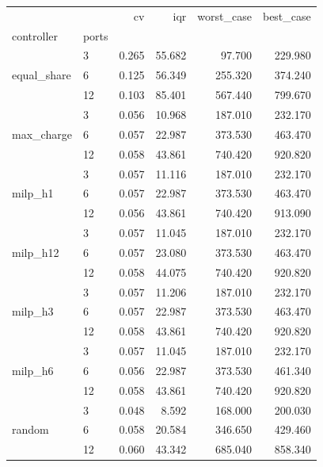 \begin{tabular}{llrrrr}
\toprule
 &  & cv & iqr & worst_case & best_case \\
controller & ports &  &  &  &  \\
\midrule
\multirow[t]{3}{*}{equal_share} & 3 & 0.265 & 55.682 & 97.700 & 229.980 \\
 & 6 & 0.125 & 56.349 & 255.320 & 374.240 \\
 & 12 & 0.103 & 85.401 & 567.440 & 799.670 \\
\cline{1-6}
\multirow[t]{3}{*}{max_charge} & 3 & 0.056 & 10.968 & 187.010 & 232.170 \\
 & 6 & 0.057 & 22.987 & 373.530 & 463.470 \\
 & 12 & 0.058 & 43.861 & 740.420 & 920.820 \\
\cline{1-6}
\multirow[t]{3}{*}{milp_h1} & 3 & 0.057 & 11.116 & 187.010 & 232.170 \\
 & 6 & 0.057 & 22.987 & 373.530 & 463.470 \\
 & 12 & 0.056 & 43.861 & 740.420 & 913.090 \\
\cline{1-6}
\multirow[t]{3}{*}{milp_h12} & 3 & 0.057 & 11.045 & 187.010 & 232.170 \\
 & 6 & 0.057 & 23.080 & 373.530 & 463.470 \\
 & 12 & 0.058 & 44.075 & 740.420 & 920.820 \\
\cline{1-6}
\multirow[t]{3}{*}{milp_h3} & 3 & 0.057 & 11.206 & 187.010 & 232.170 \\
 & 6 & 0.057 & 22.987 & 373.530 & 463.470 \\
 & 12 & 0.058 & 43.861 & 740.420 & 920.820 \\
\cline{1-6}
\multirow[t]{3}{*}{milp_h6} & 3 & 0.057 & 11.045 & 187.010 & 232.170 \\
 & 6 & 0.056 & 22.987 & 373.530 & 461.340 \\
 & 12 & 0.058 & 43.861 & 740.420 & 920.820 \\
\cline{1-6}
\multirow[t]{3}{*}{random} & 3 & 0.048 & 8.592 & 168.000 & 200.030 \\
 & 6 & 0.058 & 20.584 & 346.650 & 429.460 \\
 & 12 & 0.060 & 43.342 & 685.040 & 858.340 \\
\cline{1-6}
\bottomrule
\end{tabular}
